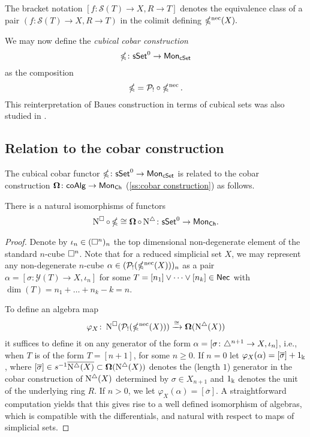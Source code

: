 The bracket notation $[f\colon \mathcal{S}(T) \to X, R\to T]$ denotes the equivalence class of a pair $(f \colon \mathcal{S}(T) \to X, R \to T)$ in the colimit defining $\operatorname{\mathbb{\Omega}^{\mathrm{nec}}}(X).$ 

We may now define the \textit{cubical cobar construction}
\[
\operatorname{\mathbb{\Omega}} \colon \mathsf{sSet}^0 \to \mathsf{Mon}_{\mathsf{cSet}}
\]
as the composition 
\[
\operatorname{\mathbb{\Omega}}= \mathcal{P}_! \circ \operatorname{\mathbb{\Omega}^{\mathrm{nec}}}.
\]
This reinterpretation of Baues construction in terms of cubical sets was also studied in \cite{rivera2018cubical}.

\subsection{Relation to the cobar construction}

The cubical cobar functor $\operatorname{\mathbb{\Omega}} \colon \mathsf{sSet}^0 \to \mathsf{Mon}_{\mathsf{cSet}}$ is related to the cobar construction $\operatorname{\mathbf{\Omega}} \colon \mathsf{coAlg} \to \mathsf{Mon}_{\mathsf{Ch}}$ (\cref{ss:cobar construction}) as follows.

\begin{lemma} \label{l:ccobar and cobar}
	There is a natural isomorphisms of functors 
	\begin{equation*}
	\operatorname{N^{\square}} \circ \operatorname{\mathbb{\Omega}} \cong \operatorname{\mathbf{\Omega}} \circ \operatorname{N^{\triangle}} \colon \mathsf{sSet}^0 \to \mathsf{Mon}_{\mathsf{Ch}}.
	\end{equation*}
\end{lemma}

\begin{proof} 
	Denote by $\iota_n \in (\square^n)_n$ the top dimensional non-degenerate element of the standard $n$-cube $\square^n$.
	Note that for a reduced simplicial set $X$, we may represent any non-degenerate $n$-cube $\alpha \in (\mathcal{P}_!(\operatorname{\mathbb{\Omega}^{\mathrm{nec}}}(X)))_n$ as a pair $\alpha = [\sigma \colon \mathcal{Y}(T) \to X, \iota_n]$ for some $T = [n_1] \vee \dots \vee [n_k] \in \mathsf{Nec}$ with $\dim(T) = n_1 + \dots + n_k-k = n$.
	
	To define an algebra map
	\begin{equation*}
	\varphi_X \colon \operatorname{N^{\square}}(\mathcal{P}_!(\operatorname{\mathbb{\Omega}^{\mathrm{nec}}}(X))) \xrightarrow{\cong} \operatorname{\mathbf{\Omega}}(\operatorname{N^{\triangle}}(X))
	\end{equation*}
	it suffices to define it on any generator of the form $\alpha=[\sigma \colon \triangle^{n+1} \to X, \iota_{n}]$, i.e., when $T$ is of the form $T=[n+1]$, for some $n\geq0$.
	If $n = 0$ let $\varphi_X(\alpha)= [\overline{\sigma}] + 1_\Bbbk$, where $[\overline{\sigma}] \in s^{-1} \overline{ \operatorname{N^{\triangle}}(X)} \subset \operatorname{\mathbf{\Omega}}(\operatorname{N^{\triangle}}(X))$ denotes the (length $1$) generator in the cobar construction of $\operatorname{N^{\triangle}}(X)$ determined by $\sigma \in X_{n+1}$ and $1_\Bbbk$ denotes the unit of the underlying ring $R$.
	If $n>0$, we let $\varphi_X(\alpha)=[\overline{\sigma}]$.
	A straightforward computation yields that this gives rise to a well defined isomorphism of algebras, which is compatible with the differentials, and natural with respect to maps of simplicial sets.
\end{proof}

